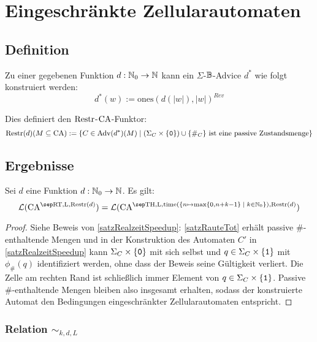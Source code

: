 \chapter{Eingeschränkte Zellularautomaten}
\label{chap:EingeschrAuto}

\section{Definition}

\begin{definition}
    Zu einer gegebenen Funktion $d: \mathbb{N}_0 \to \mathbb{N}$ kann ein $\Sigma$-$\mathbb{B}$-Advice $d^*$ wie folgt konstruiert werden:
    \[
        d^*(w) := \mathrm{ones}(d(|w|), |w|)^{Rev}
    \]        

    Dies definiert den $\mathrm{Restr}$-$\textrm{CA}$-Funktor:
    \[
        \mathrm{Restr}(d)(M \subseteq \textrm{CA}) := \{ { C \in \textrm{Adv}(d^*)(M) } \; | \; { (\Sigma_C \times \{ { \texttt{0} } \}) \cup \{ { \#_C } \} \text{ ist eine passive Zustandsmenge} } \}
    \]
\end{definition}

\section{Ergebnisse}

\begin{satz}
    \label{satzEingeschraenktRealzeitSpeedup}
    Sei $d$ eine Funktion $d: \mathbb{N}_0 \to \mathbb{N}$. Es gilt:
    \[
        \CAL{\CART, \CALeft, \CARestr(d)} = \CAL{\CAT, \CALeft, \mathrm{time}(\set{ n \mapsto \max \finset{0,  n + k - 1} }{ k \in \Nz }), \CARestr(d)}
    \]
\end{satz}
\begin{proof}
    Siehe Beweis von \cref{satzRealzeitSpeedup}:
    \cref{satzRauteTot} erhält passive \#-enthaltende Mengen und 
    in der Konstruktion des Automaten $C'$ in \cref{satzRealzeitSpeedup}
    kann $\Sigma_C \times \{ {\texttt{0}} \}$ mit sich selbst und
    $q \in \Sigma_C \times \{ {\texttt{1}} \}$ mit $\phi_{\#}(q)$ identifiziert werden, ohne dass der Beweis seine Gültigkeit verliert.
    Die Zelle am rechten Rand ist schließlich immer Element von $q \in \Sigma_C \times \{ {\texttt{1}} \}$.
    Passive \#-enthaltende Mengen bleiben also insgesamt erhalten, sodass der konstruierte Automat
    den Bedingungen eingeschränkter Zellularautomaten entspricht.
\end{proof}

\subsection{Relation \texorpdfstring{$\sim_{k,d,L}$}{sim_kdL}}

